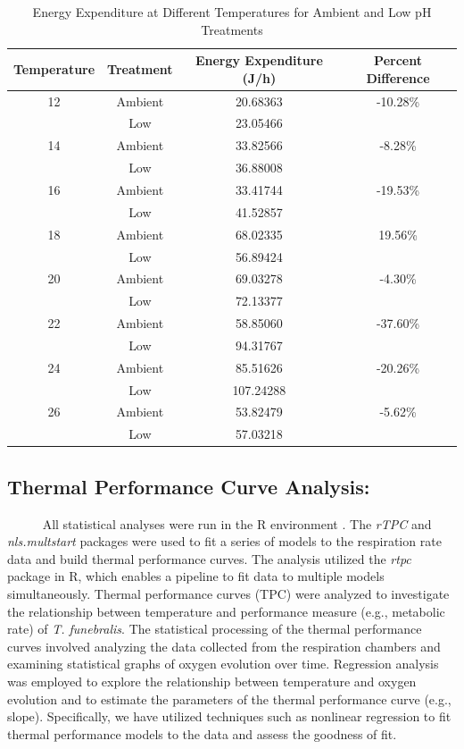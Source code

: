 \documentclass[
]{article}
\begin{document}
\begin{table}[htbp]
    \centering
    \caption{Energy Expenditure at Different Temperatures for Ambient and Low pH Treatments}
    \label{table3}
    \begin{tabular}{cccc}
    \toprule
    Temperature & Treatment & Energy Expenditure (J/h) & Percent Difference \\
    \midrule
    12 & Ambient & 20.68363 & -10.28\% \\
    & Low & 23.05466 & \\
    14 & Ambient & 33.82566 & -8.28\% \\
    & Low & 36.88008 & \\
    16 & Ambient & 33.41744 & -19.53\% \\
    & Low & 41.52857 & \\
    18 & Ambient & 68.02335 & 19.56\% \\
    & Low & 56.89424 & \\
    20 & Ambient & 69.03278 & -4.30\% \\
    & Low & 72.13377 & \\
    22 & Ambient & 58.85060 & -37.60\% \\
    & Low & 94.31767 & \\
    24 & Ambient & 85.51626 & -20.26\% \\
    & Low & 107.24288 & \\
    26 & Ambient & 53.82479 & -5.62\% \\
    & Low & 57.03218 & \\
    \bottomrule
    \end{tabular}
\end{table}

\newpage

\subsection*{Thermal Performance Curve Analysis:}

~~~~~ All statistical analyses were run in the R environment
\citep{R_core_team_2021}. The \textit{rTPC} \citep{padfield2021rtpc} and
\textit{nls.multstart} packages were used to fit a series of models to
the respiration rate data and build thermal performance curves. The
analysis utilized the \textit{rtpc} package in R, which enables a
pipeline to fit data to multiple models simultaneously. Thermal
performance curves (TPC) were analyzed to investigate the relationship
between temperature and performance measure (e.g., metabolic rate) of
\textit{T. funebralis}. The statistical processing of the thermal
performance curves involved analyzing the data collected from the
respiration chambers and examining statistical graphs of oxygen
evolution over time. Regression analysis was employed to explore the
relationship between temperature and oxygen evolution and to estimate
the parameters of the thermal performance curve (e.g., slope).
Specifically, we have utilized techniques such as nonlinear regression
to fit thermal performance models to the data and assess the goodness of
fit.
\end{document}
